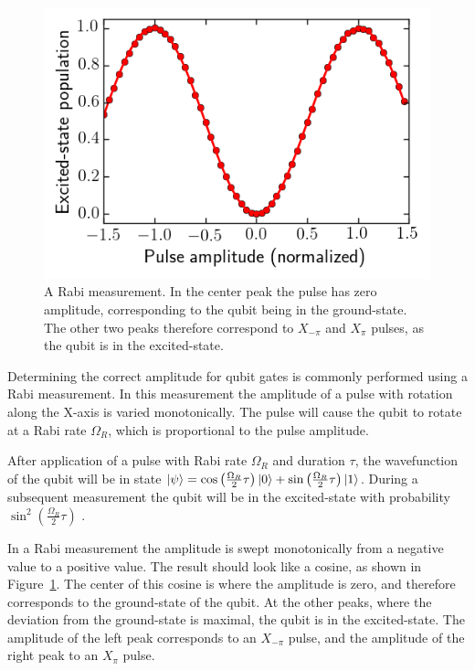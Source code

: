         \begin{figure}
          \begin{center}
          \vspace{-30pt}
            \includegraphics[width=\textwidth]{../Figures/Qubit characterization/Rabi.png}
          \end{center}
          \vspace{-20 pt}
          \caption{A Rabi measurement. In the center peak the pulse has zero amplitude, corresponding to the qubit being in the ground-state. The other two peaks therefore correspond to $X_{-\pi}$ and $X_\pi$ pulses, as the qubit is in the excited-state.}
          \label{fig:Rabi}
        \end{figure}

        Determining the correct amplitude for qubit gates is commonly performed using a Rabi measurement. In this measurement the amplitude of a pulse with rotation along the X-axis is varied monotonically. The pulse will cause the qubit to rotate at a Rabi rate $\Omega_R$, which is proportional to the pulse amplitude.

        After application of a pulse with Rabi rate $\Omega_R$ and duration $\tau$, the wavefunction of the qubit will be in state $\ket{\psi} = \cos{\left( \frac{\Omega_R}{2} \tau \right) } \ket{0} + \sin{\left( \frac{\Omega_R}{2} \tau \right)} \ket{1}$. During a subsequent measurement the qubit will be in the excited-state with probability $\sin^2{\left( \frac{\Omega_R}{2} \tau \right)}$ \cite{Reed}.

        In a Rabi measurement the amplitude is swept monotonically from a negative value to a positive value. The result should look like a cosine, as shown in Figure~\ref{fig:Rabi}. The center of this cosine is where the amplitude is zero, and therefore corresponds to the ground-state of the qubit. At the other peaks, where the deviation from the ground-state is maximal, the qubit is in the excited-state. The amplitude of the left peak corresponds to an $X_{-\pi}$ pulse, and the amplitude of the right peak to an $X_\pi$ pulse.

